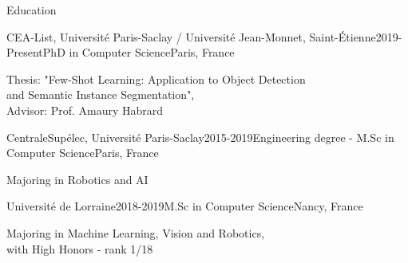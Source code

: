 \documentclass{resume} %
\begin{document}

\begin{rSection}{Education}

\begin{rSubsection}{CEA-List, Université Paris-Saclay / Université Jean-Monnet, Saint-Étienne}{2019-Present}{PhD in Computer Science}{Paris, France}
    \item[] Thesis: "Few-Shot Learning: Application to Object Detection \\ and Semantic Instance Segmentation",\\ Advisor: Prof. Amaury Habrard
    
\end{rSubsection}


\begin{rSubsection}{CentraleSupélec, Université Paris-Saclay}{2015-2019}{Engineering degree - M.Sc in Computer Science}{Paris, France}
    \item[] Majoring in Robotics and AI
    
\end{rSubsection}


\begin{rSubsection}{Université de Lorraine}{2018-2019}{M.Sc in Computer Science}{Nancy, France}
    \item[] Majoring in Machine Learning, Vision and Robotics, \\
            with High Honors - rank 1/18
    
\end{rSubsection}



\end{rSection}
\end{document}
